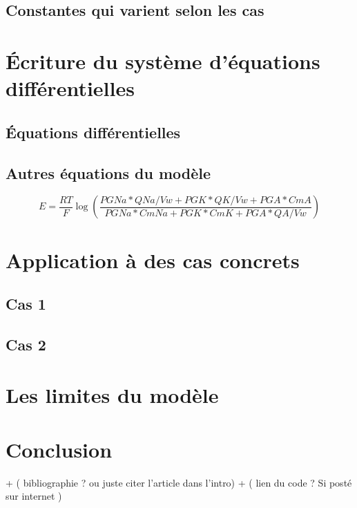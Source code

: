 \documentclass[a4paper]{article}
\begin{document}
\subsection{Constantes qui varient selon les cas}

\section{Écriture du système d'équations différentielles}   


\subsection{Équations différentielles}

\subsection{Autres équations du modèle}


\begin{equation}
E = \frac{RT}{F}\log{(\frac{PGNa*QNa/Vw + PGK*QK/Vw + PGA*CmA}{PGNa*CmNa + PGK*CmK + PGA*QA/Vw})}
\end{equation}


\section{Application à des cas concrets}     

\subsection{Cas 1} 

\subsection{Cas 2} 

\section{Les limites du modèle}


\section{Conclusion} 

+ ( bibliographie ? ou juste citer l'article dans l'intro)
+ ( lien du code ? Si posté sur internet )
 
\end{document}
